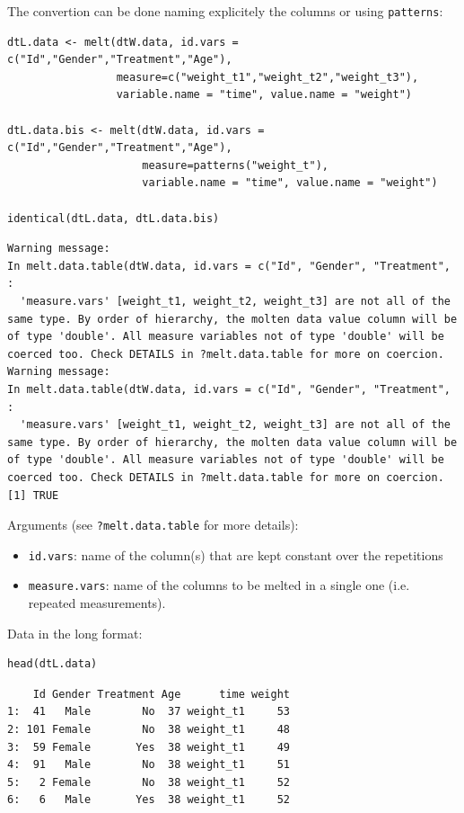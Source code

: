\documentclass{article}
\begin{document}
The convertion can be done naming explicitely the columns or using \texttt{patterns}:
\lstset{language=r,label= ,caption= ,captionpos=b,numbers=none}
\begin{lstlisting}
dtL.data <- melt(dtW.data, id.vars = c("Id","Gender","Treatment","Age"), 
                 measure=c("weight_t1","weight_t2","weight_t3"), 
                 variable.name = "time", value.name = "weight")

dtL.data.bis <- melt(dtW.data, id.vars = c("Id","Gender","Treatment","Age"), 
                     measure=patterns("weight_t"), 
                     variable.name = "time", value.name = "weight")

identical(dtL.data, dtL.data.bis)
\end{lstlisting}

\begin{verbatim}
Warning message:
In melt.data.table(dtW.data, id.vars = c("Id", "Gender", "Treatment",  :
  'measure.vars' [weight_t1, weight_t2, weight_t3] are not all of the same type. By order of hierarchy, the molten data value column will be of type 'double'. All measure variables not of type 'double' will be coerced too. Check DETAILS in ?melt.data.table for more on coercion.
Warning message:
In melt.data.table(dtW.data, id.vars = c("Id", "Gender", "Treatment",  :
  'measure.vars' [weight_t1, weight_t2, weight_t3] are not all of the same type. By order of hierarchy, the molten data value column will be of type 'double'. All measure variables not of type 'double' will be coerced too. Check DETAILS in ?melt.data.table for more on coercion.
[1] TRUE
\end{verbatim}



Arguments (see \texttt{?melt.data.table} for more details):
\begin{itemize}
\item \texttt{id.vars}: name of the column(s) that are kept constant over the repetitions
\item \texttt{measure.vars}: name of the columns to be melted in a single one
(i.e. repeated measurements).
\end{itemize}

\bigskip

Data in the long format:
\lstset{language=r,label= ,caption= ,captionpos=b,numbers=none}
\begin{lstlisting}
head(dtL.data)
\end{lstlisting}

\begin{verbatim}
    Id Gender Treatment Age      time weight
1:  41   Male        No  37 weight_t1     53
2: 101 Female        No  38 weight_t1     48
3:  59 Female       Yes  38 weight_t1     49
4:  91   Male        No  38 weight_t1     51
5:   2 Female        No  38 weight_t1     52
6:   6   Male       Yes  38 weight_t1     52
\end{verbatim}
\end{document}
